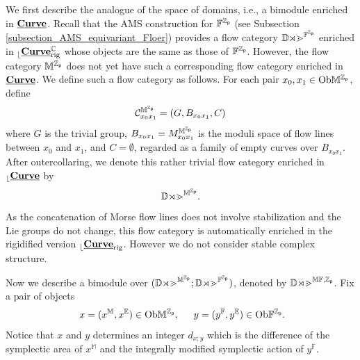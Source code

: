\documentclass[reqno, 10pt]{amsart}
\numberwithin{equation}{section}
\numberwithin{equation}{section}
\theoremstyle{definition}
\theoremstyle{remark}
\newcommand{\beqn}{\begin{equation*}}
\newcommand{\eeqn}{\end{equation*}}
\newcommand{\mb}{\mathbb}
\newcommand{\mc}{\mathcal}
\newcommand{\zp}{{{\mb Z}_{\sf p}}}
\newcommand{\ep}{{{\mathbb E}}}
\renewcommand{\outer}{{}_{\lfloor}}
\newcommand{\uds}[1]{\underline{\smash{#1}}}
\begin{document}
We first describe the analogue of the space of domains, i.e., a bimodule enriched in $\uds{\bf Curve}$. Recall that the AMS construction for $\mb{F}^\zp$ (see Subsection \ref{subsection_AMS_equivariant_Floer}) provides a flow category $\mb{Dom}^{\mb{F}^\zp}$ enriched in $\outer \uds{\bf Curve}_{\rm rig}^{\mb C}$ whose objects are the same as those of $\mb{F}^\zp$. However, the flow category $\mb{M}^\zp$ does not yet have such a corresponding flow category enriched in $\uds{\bf Curve}$. We define such a flow category as follows. For each pair $x_0, x_1 \in {\rm Ob}{\mb M}^\zp$, define
\beqn
{\mc C}_{x_0 x_1}^{\mb{M}^\zp} = (G, B_{x_0 x_1}, C)
\eeqn
where $G$ is the trivial group, $B_{x_0x_1} = M_{x_0 x_1}^{\mb{M}^\zp}$ is the moduli space of flow lines between $x_0$ and $x_1$, and $C = \emptyset$, regarded as a family of empty curves over $B_{x_0 x_1}$. After outercollaring, we denote this rather trivial flow category enriched in $\outer \uds{\bf Curve}$ by 
\beqn
\mb{Dom}^{\mb{M}^\zp}.
\eeqn
As the concatenation of Morse flow lines does not involve stabilization and the Lie groups do not change, this flow category is automatically enriched in the rigidified version $\outer \uds{\bf Curve}_{\rm rig}$. However we do not consider stable complex structure. 

Now we describe a bimodule over $(\mb{Dom}^{\mb{M}^\zp} ; \mb{Dom}^{\mb{F}^\zp})$, denoted by $\mb{Dom}^{\mb{MF}, \zp}$. Fix a pair of objects
\begin{align*}
&\ x = (x^{\mb M}, x^\ep) \in {\rm Ob} {\mb M}^\zp,\ &\ y = (y^{\mb F}, y^\ep) \in {\rm Ob}{\mb F}^\zp.
\end{align*}
Notice that $x$ and $y$ determines an integer $d_{x;y}$ which is the difference of the symplectic area of $x^{\mb M}$ and the integrally modified symplectic action of $y^{\mb F}$.
\end{document}

